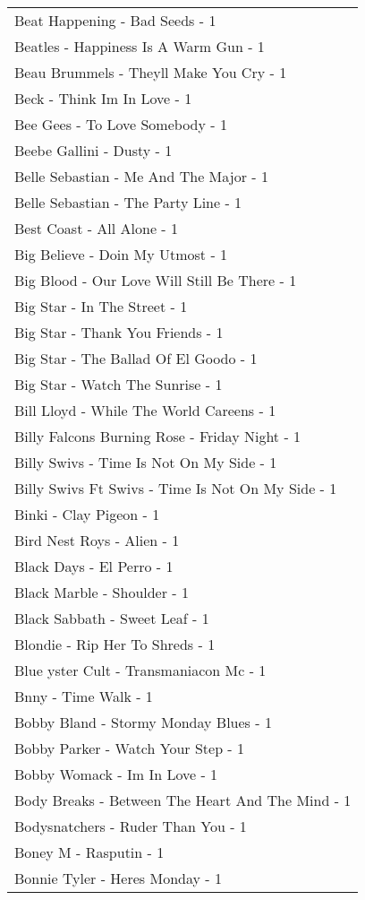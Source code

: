 \documentclass[
]{article}
\begin{document}
\begin{longtable}{l}
Beat Happening - Bad Seeds - 1 \\ 
Beatles - Happiness Is A Warm Gun - 1 \\ 
Beau Brummels - Theyll Make You Cry - 1 \\ 
Beck - Think Im In Love - 1 \\ 
Bee Gees - To Love Somebody - 1 \\ 
Beebe Gallini - Dusty - 1 \\ 
Belle Sebastian - Me And The Major - 1 \\ 
Belle Sebastian - The Party Line - 1 \\ 
Best Coast - All Alone - 1 \\ 
Big Believe - Doin My Utmost - 1 \\ 
Big Blood - Our Love Will Still Be There - 1 \\ 
Big Star - In The Street - 1 \\ 
Big Star - Thank You Friends - 1 \\ 
Big Star - The Ballad Of El Goodo - 1 \\ 
Big Star - Watch The Sunrise - 1 \\ 
Bill Lloyd - While The World Careens - 1 \\ 
Billy Falcons Burning Rose - Friday Night - 1 \\ 
Billy Swivs - Time Is Not On My Side - 1 \\ 
Billy Swivs Ft Swivs - Time Is Not On My Side - 1 \\ 
Binki - Clay Pigeon - 1 \\ 
Bird Nest Roys - Alien - 1 \\ 
Black Days - El Perro - 1 \\ 
Black Marble - Shoulder - 1 \\ 
Black Sabbath - Sweet Leaf - 1 \\ 
Blondie - Rip Her To Shreds - 1 \\ 
Blue yster Cult - Transmaniacon Mc - 1 \\ 
Bnny - Time Walk - 1 \\ 
Bobby Bland - Stormy Monday Blues - 1 \\ 
Bobby Parker - Watch Your Step - 1 \\ 
Bobby Womack - Im In Love - 1 \\ 
Body Breaks - Between The Heart And The Mind - 1 \\ 
Bodysnatchers - Ruder Than You - 1 \\ 
Boney M - Rasputin - 1 \\ 
Bonnie Tyler - Heres Monday - 1 \\ 

\end{longtable}
\end{document}
